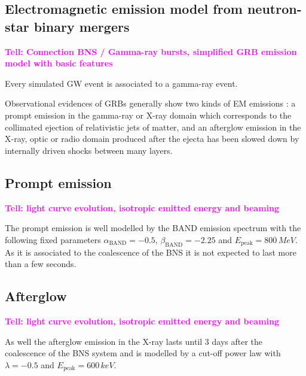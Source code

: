 \documentclass[a0,portrait]{a0poster}
\newcommand{\ECM}[1] {\textbf{\textcolor{magenta}{#1}}}
\begin{document}
\begin{multicols}{2}
\section*{Electromagnetic emission model from neutron-star binary mergers}

\ECM{Tell: Connection BNS / Gamma-ray bursts, simplified GRB emission model with basic features}

Every simulated GW event is associated to a gamma-ray event.

Observational evidences of GRBs generally show two kinds of EM emissions : a
prompt emission in the gamma-ray or X-ray domain which corresponds to the
collimated ejection of relativistic jets of matter, and an afterglow emission in
the X-ray, optic or radio domain produced after the ejecta has been slowed down
by internally driven shocks between many layers.

\subsection*{Prompt emission}

\ECM{Tell: light curve evolution, isotropic emitted energy and beaming}

The prompt emission is well modelled by the BAND emission spectrum with the
following fixed parameters $\alpha_{\mathrm{BAND}} = - 0.5$,
$\beta_{\mathrm{BAND}} = - 2.25$ and $E_{\mathrm{peak}} = 800 \, MeV$. As it is
associated to the coalescence of the BNS it is not expected to last more than a
few seconds. 

\subsection*{Afterglow}

\ECM{Tell: light curve evolution, isotropic emitted energy and beaming}

As well the afterglow emission in the X-ray lasts until 3 days after the
coalescence of the BNS system and is modelled by a cut-off power law with
$\lambda = - 0.5$ and $E_{\mathrm{peak}} = 600 \, keV$. 



\end{multicols}
\end{document}
